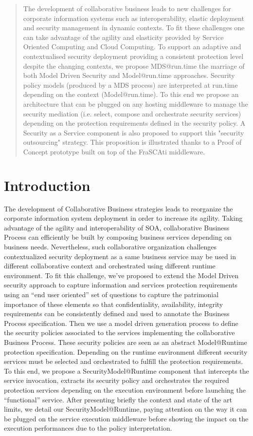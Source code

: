 \documentclass[runningheads,a4paper]{llncs}
\begin{document}
\begin{abstract}
The development of collaborative business leads to new challenges for corporate information systems such as interoperability, elastic deployment and security management in dynamic contexts. To fit these challenges one can take advantage of the agility and elasticity provided by Service Oriented Computing and Cloud Computing. To support an adaptive and contextualised security deployment providing a consistent protection level despite the changing contexts, we propose MDS@run.time the marriage of both Model Driven Security and Model@run.time approaches. Security policy models (produced by a MDS process) are interpreted at run.time depending on the context (Model@run.time). To this end we propose an architecture that can be plugged on any hosting middleware to manage the security mediation (i.e. select, compose and orchestrate security services) depending on the protection requirements defined in the security policy. A Security as a Service component is also proposed to support this "security outsourcing" strategy. This proposition is illustrated thanks to a Proof of Concept prototype built on top of the FraSCAti middleware.
\end{abstract}

\section{Introduction}
The development of Collaborative Business strategies leads to reorganize the corporate information system deployment in order to increase its agility. Taking advantage of the agility and interoperability of SOA, collaborative Business Process can efficiently be built by composing business services depending on business needs. Nevertheless, such collaborative organization challenges contextualized security deployment as a same business service may be used in different collaborative context and orchestrated using different runtime environment.
To fit this challenge, we've proposed to extend the Model Driven security approach to capture information and services protection requirements using an “end user oriented” set of questions to capture the patrimonial importance of these elements so that confidentiality, availability, integrity requirements can be consistently defined and used to annotate the Business Process specification. Then we use a model driven generation process to define the security policies associated to the services implementing the collaborative Business Process.
These security policies are seen as an abstract Model@Runtime protection specification. Depending on the runtime environment different security services must be selected and orchestrated to fulfill the protection requirements. To this end, we propose a SecurityModel@Runtime component that intercepts the service invocation, extracts its security policy and orchestrates the required protection services depending on the execution environment before launching the “functional” service. 
After presenting briefly the context and state of the art limits, we detail our SecurityModel@Runtime, paying attention on the way it can be plugged on the service execution middleware before showing the impact on the execution performances due to the policy interpretation.
\end{document}
